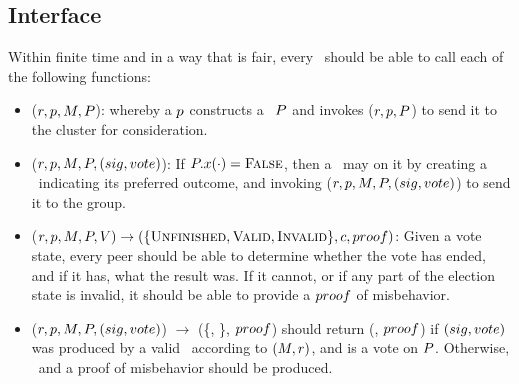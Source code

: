%
%
%
%
\subsection{Interface}
Within finite time and in a way that is fair, every \KwPeer~should be able
to call each of the following functions:
\begin{itemize}
  \item \NamePropose($r, p, M, P$):
    whereby a \KwPeer $p$ constructs a \StructPetition~$P$ and
    invokes \NameSend($r, p, P$) to send it to the cluster
    for consideration.
  \item \NameVote($r, p, M, P, (sig, vote)$): If
    $P.x(\cdot) = \textsc{False}$, then a \KwPeer~\peer may
    \NameVote on it by creating a \StructBallot~\Ballot indicating its preferred
    outcome, and invoking \NameSend($r, p, M, P,
    (sig, vote)$) to send it to the group.
  \item \NameEvaluate($r, p, M, P, V) \to
    (\{\textsc{Unfinished}, \textsc{Valid}, \textsc{Invalid}\}, c, proof)$: Given a
    vote state, every peer should be able to determine whether the vote
    has ended, and if it has, what the result was. If it cannot, or if any part
    of the election state is invalid, it should be able to provide a $proof$
    of misbehavior.
  \item \NameEvaluate($r, p, M, P, (sig, vote)$)
    $\to$ (\{\AtomTrue, \AtomFalse\}, $proof$) should return (\AtomTrue,
    $proof$) if $(sig, vote)$ was produced by a valid \KwPeer~according to
    $(M, r)$, and is a vote on $P$. Otherwise, \AtomFalse~and a proof
    of misbehavior should be produced.
\end{itemize}

